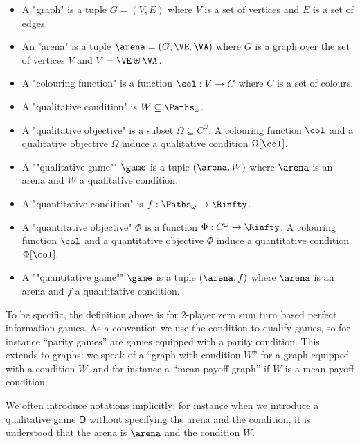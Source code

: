 \begin{definition}[""Games""]
\begin{itemize}
	\item A "graph" is a tuple $G = (V,E)$ where $V$ is a set of vertices
	and $E$ is a set of edges.
	
	\item An "arena" is a tuple $\arena = (G,\VE,\VA)$ where $G$ is a graph over the set of vertices $V$ and $V = \VE \uplus \VA$.

	\item A "colouring function" is a function $\col : V \to C$ where $C$ is a set of colours.

	\item A "qualitative condition" is $W \subseteq \Paths_\omega$.
	
	\item A "qualitative objective" is a subset $\Omega \subseteq C^\omega$.
	A colouring function $\col$ and a qualitative objective $\Omega$ induce 
	a qualitative condition $\Omega[\col]$.

	\item A ""qualitative game"" $\game$ is a tuple $(\arena,W)$ where $\arena$ is an arena and $W$ a qualitative condition.

	\item A "quantitative condition" is $f : \Paths_\omega \to \Rinfty$.

	\item A "quantitative objective" $\Phi$ is a function $\Phi : C^\omega \to \Rinfty$.
	A colouring function $\col$ and a quantitative objective $\Phi$ induce 
	a quantitative condition $\Phi[\col]$.
	
	\item A ""quantitative game"" $\game$ is a tuple $(\arena,f)$ where $\arena$ is an arena and $f$ a quantitative condition.	
\end{itemize}
\end{definition}
To be specific, the definition above is for $2$-player zero sum turn based perfect information games.
As a convention we use the condition to qualify games, so for instance ``parity games'' are games equipped with a parity condition.
This extends to graphs: we speak of a ``graph with condition $W$'' for a graph equipped with a condition $W$,
and for instance a ``mean payoff graph'' if $W$ is a mean payoff condition.

We often introduce notations implicitly: for instance when we introduce a qualitative game $\Game$ without specifying the arena and the condition, it is understood that the arena is $\arena$ and the condition $W$.

